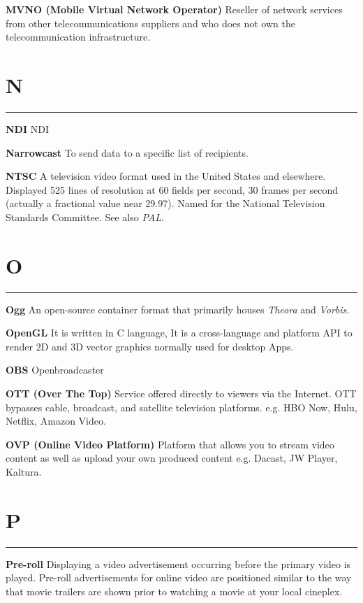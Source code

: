 \smallskip
\textbf{MVNO (Mobile Virtual Network Operator)}
Reseller of network services from other telecommunications suppliers and who does not own the telecommunication infrastructure.


\section{N}
\hrule

\medskip
\textbf{NDI}
NDI

\smallskip
\textbf{Narrowcast}
To send data to a specific list of recipients.

\smallskip
\textbf{NTSC}
A television video format used in the United States and elsewhere. Displayed 525 lines of resolution at 60 fields per second, 30 frames per second (actually a fractional value near 29.97). Named for the National Television Standards Committee. See also \textit{PAL}.


\section{O}
\hrule

\medskip
\textbf{Ogg}
An open-source container format that primarily houses \textit{Theora} and \textit{Vorbis}.

\smallskip
\textbf{OpenGL}
It is written in C language, It is a cross-language and platform API to render 2D and 3D vector graphics normally used for desktop Apps.

\smallskip
\textbf{OBS}
Openbroadcaster

\smallskip
\textbf{OTT (Over The Top)}
Service offered directly to viewers via the Internet. OTT bypasses cable, broadcast, and satellite television platforms. e.g. HBO Now, Hulu, Netflix, Amazon Video.

\smallskip
\textbf{OVP (Online Video Platform)}
Platform that allows you to stream video content as well as upload your own produced content e.g. Dacast, JW Player, Kaltura.


\section{P}
\hrule



\medskip
\textbf{Pre-roll}
Displaying a video advertisement occurring before the primary video is played. Pre-roll advertisements for online video are positioned similar to the way that movie trailers are shown prior to watching a movie at your local cineplex.


